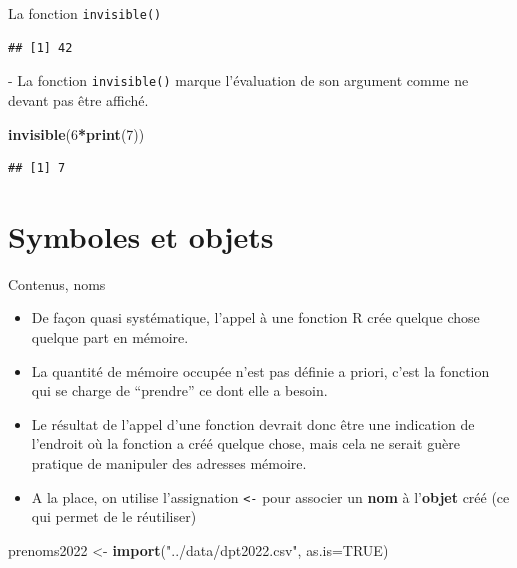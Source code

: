 \documentclass[
  ignorenonframetext,
]{beamer}
\newenvironment{Shaded}{\begin{snugshade}}{\end{snugshade}}
\newcommand{\AttributeTok}[1]{\textcolor[rgb]{0.13,0.29,0.53}{#1}}
\newcommand{\ConstantTok}[1]{\textcolor[rgb]{0.56,0.35,0.01}{#1}}
\newcommand{\DecValTok}[1]{\textcolor[rgb]{0.00,0.00,0.81}{#1}}
\newcommand{\FunctionTok}[1]{\textcolor[rgb]{0.13,0.29,0.53}{\textbf{#1}}}
\newcommand{\NormalTok}[1]{#1}
\newcommand{\OtherTok}[1]{\textcolor[rgb]{0.56,0.35,0.01}{#1}}
\newcommand{\SpecialCharTok}[1]{\textcolor[rgb]{0.81,0.36,0.00}{\textbf{#1}}}
\newcommand{\StringTok}[1]{\textcolor[rgb]{0.31,0.60,0.02}{#1}}
\providecommand{\tightlist}{%
  \setlength{\itemsep}{0pt}\setlength{\parskip}{0pt}}
\begin{document}
\begin{frame}[fragile]{La fonction \texttt{invisible()}}
\begin{verbatim}
## [1] 42
\end{verbatim}

\normalsize - La fonction \texttt{invisible()} marque l'évaluation de
son argument comme ne devant pas être affiché.

\tiny

\begin{Shaded}
\begin{Highlighting}[]
\FunctionTok{invisible}\NormalTok{(}\DecValTok{6}\SpecialCharTok{*}\FunctionTok{print}\NormalTok{(}\DecValTok{7}\NormalTok{))}
\end{Highlighting}
\end{Shaded}

\begin{verbatim}
## [1] 7
\end{verbatim}

\normalsize
\end{frame}

\hypertarget{symboles-et-objets}{%
\section{Symboles et objets}\label{symboles-et-objets}}

\begin{frame}[fragile]{Contenus, noms}
\protect\hypertarget{contenus-noms}{}
\begin{itemize}
\tightlist
\item
  De façon quasi systématique, l'appel à une fonction R crée quelque
  chose quelque part en mémoire.
\item
  La quantité de mémoire occupée n'est pas définie a priori, c'est la
  fonction qui se charge de ``prendre'' ce dont elle a besoin.
\item
  Le résultat de l'appel d'une fonction devrait donc être une indication
  de l'endroit où la fonction a créé quelque chose, mais cela ne serait
  guère pratique de manipuler des adresses mémoire.
\item
  A la place, on utilise l'assignation \texttt{\textless{}-} pour
  associer un \textbf{nom} à l'\textbf{objet} créé (ce qui permet de le
  réutiliser)
\end{itemize}

\tiny

\begin{Shaded}
\begin{Highlighting}[]
\NormalTok{prenoms2022 }\OtherTok{\textless{}{-}} \FunctionTok{import}\NormalTok{(}\StringTok{"../data/dpt2022.csv"}\NormalTok{, }\AttributeTok{as.is=}\ConstantTok{TRUE}\NormalTok{)}
\end{Highlighting}
\end{Shaded}

\normalsize
\end{frame}
\end{document}
